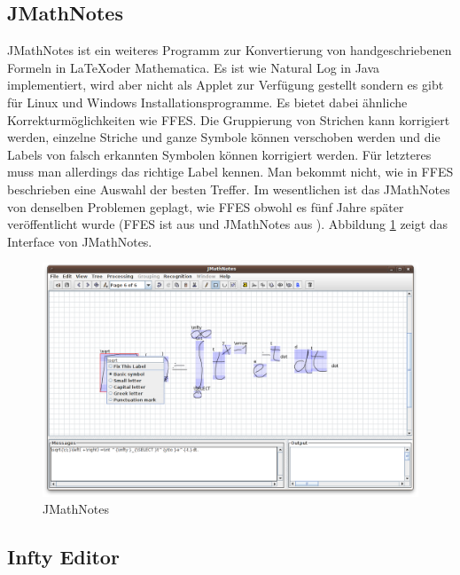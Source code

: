 \subsection{JMathNotes}

JMathNotes ist ein weiteres Programm zur Konvertierung von handgeschriebenen Formeln in \LaTeX oder Mathematica.  Es ist wie Natural Log in Java implementiert, wird aber nicht als Applet zur Verfügung gestellt sondern es gibt für Linux und Windows Installationsprogramme. Es bietet dabei ähnliche Korrekturmöglichkeiten wie FFES. Die Gruppierung von Strichen kann korrigiert werden, einzelne Striche und ganze Symbole können verschoben werden und die Labels von falsch erkannten Symbolen können korrigiert werden. Für letzteres muss man allerdings das richtige Label kennen. Man bekommt nicht, wie in FFES beschrieben eine Auswahl der besten Treffer.
Im wesentlichen ist das JMathNotes von denselben Problemen geplagt, wie FFES obwohl es fünf Jahre später veröffentlicht wurde (FFES ist aus \citeyear{Matasakis:1999p9465} und JMathNotes aus \citeyear{jmathnotes}). Abbildung \ref{fig:jmathnotes} zeigt das Interface von JMathNotes.

\begin{figure}
  \begin{center}
    \includegraphics[width=\textwidth]{figures/jmathnotes.png}
  \end{center}
  \caption{JMathNotes}
  \label{fig:jmathnotes}
\end{figure}

\subsection{Infty Editor}

